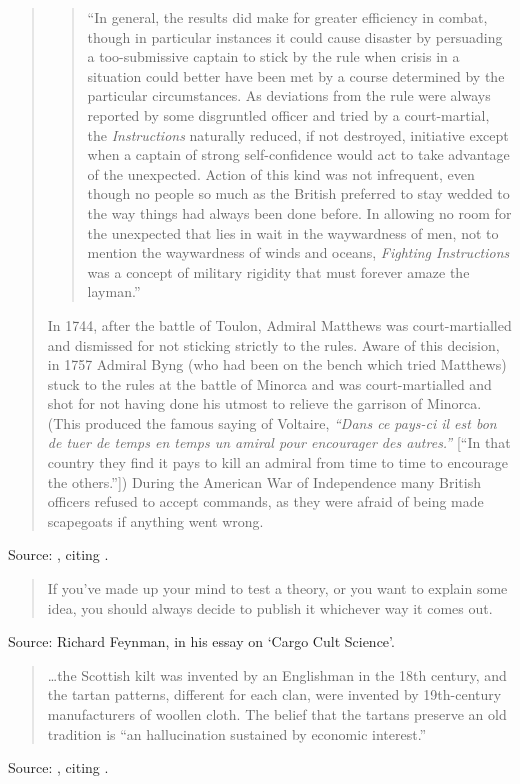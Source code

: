 \documentclass[a4paper]{article}
\begin{document}
\begin{quotation}
\begin{quote}
``In general, the results did make for greater efficiency in combat, though in particular instances
it could cause disaster by persuading a too-submissive captain to stick by the rule when crisis in
a situation could better have been met by a course determined by the particular circumstances.  As
deviations from the rule were always reported by some disgruntled officer and tried by a
court-martial, the \emph{Instructions} naturally reduced, if not destroyed, initiative except when
a captain of strong self-confidence would act to take advantage of the unexpected.  Action of this
kind was not infrequent, even though no people so much as the British preferred to stay wedded to
the way things had always been done before.  In allowing no room for the unexpected that lies in
wait in the waywardness of men, not to mention the waywardness of winds and oceans, \emph{Fighting
Instructions} was a concept of military rigidity that must forever amaze the layman.''
\end{quote}
In 1744, after the battle of Toulon, Admiral Matthews was court-martialled and dismissed for not
sticking strictly to the rules.  Aware of this decision, in 1757 Admiral Byng (who had been on the
bench which tried Matthews) stuck to the rules at the battle of Minorca and was court-martialled
and shot for not having done his utmost to relieve the garrison of Minorca.  (This produced the
famous saying of Voltaire, \emph{``Dans ce pays-ci il est bon de tuer de temps en temps un amiral
pour encourager des autres.''} [``In that country they find it pays to kill an admiral from time to
time to encourage the others.''])  During the American War of Independence many British officers
refused to accept commands, as they were afraid of being made scapegoats if anything went wrong.
\end{quotation}
Source: \citet[pp.~52--53]{Kletz1991}, citing \cite[pp.~165, 175, 120--128]{Tuchman1988}.
\medskip

\begin{quote}
	If you've made up your mind to test a theory, or you want to explain some idea, you should
always decide to publish it whichever way it comes out.
\end{quote}
Source: Richard Feynman, in his essay on `Cargo Cult Science'.
\medskip

\begin{quote}
	\ldots the Scottish kilt was invented by an Englishman in the 18th century, and the tartan
patterns, different for each clan, were invented by 19th-century manufacturers of woollen cloth.
The belief that the tartans preserve an old tradition is ``an hallucination sustained by economic
interest.''
\end{quote}
Source: \citet[p.~186]{Kletz1996}, citing \citet{Hobsbawn1983}.
\medskip
\end{document}
